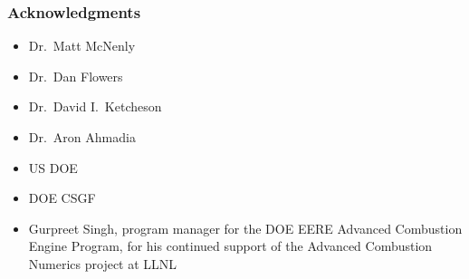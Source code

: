 \documentclass [14pt]{beamer}
\begin{document}
\begin{frame}
\frametitle{Acknowledgments}
\begin{itemize}
\item Dr.\ Matt McNenly
\item Dr.\ Dan Flowers
\item Dr.\ David I.\ Ketcheson
\item Dr.\ Aron Ahmadia
\item US DOE
\item DOE CSGF
\item Gurpreet Singh, program manager for the DOE EERE Advanced
  Combustion Engine Program, for his continued support of the Advanced
  Combustion Numerics project at LLNL
\end{itemize}
\end{frame}

\begin{frame}
\end{frame}
\end{document}
